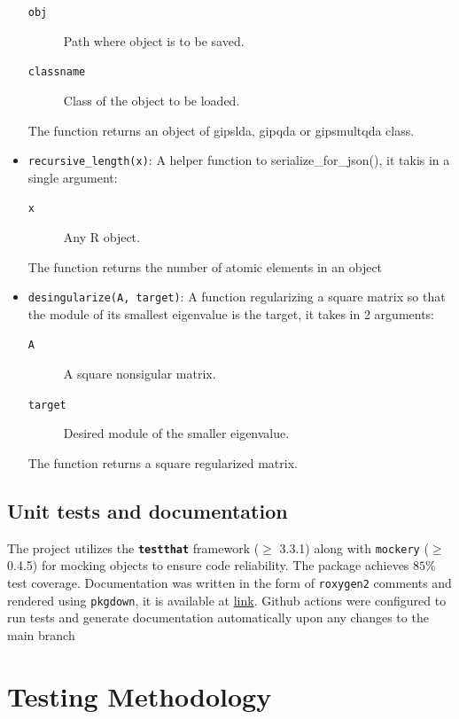 \documentclass[a4paper,11pt,twoside]{report}
\theoremstyle{definition}
\begin{document}
\begin{itemize}
\begin{description}
        \item[\texttt{obj}] Path where object is to be saved.
        \item[\texttt{classname}] Class of the object to be loaded.
    \end{description}
    The function returns an object of gipslda, gipqda or gipsmultqda class.
    \item \texttt{recursive\_length(x)}: A helper function to serialize\_for\_json(), it takis in a single argument:
    \begin{description}
        \item[\texttt{x}] Any R object.
    \end{description}
    The function returns the number of atomic elements in an object
    \item \texttt{desingularize(A, target)}: A function regularizing a square matrix so that the module of its smallest eigenvalue is the target, it takes in 2 arguments:
    \begin{description}
        \item[\texttt{A}] A square nonsigular matrix.
        \item[\texttt{target}] Desired module of the smaller eigenvalue.
    \end{description}
    The function returns a square regularized matrix.
\end{itemize}
\section{Unit tests and documentation}
The project utilizes the \textbf{\texttt{testthat}} framework ($\ge$ 3.3.1) along with \texttt{mockery} ($\ge$ 0.4.5) for mocking objects to ensure code reliability. The package achieves $85\%$ test coverage.
Documentation was written in the form of \texttt{roxygen2} comments and rendered using \texttt{pkgdown}, it is available at \href{https://antonikingston.github.io/gipsDA/}{link}. Github actions were configured to run tests and generate documentation automatically upon any changes to the main branch



\chapter{Testing Methodology}
\label{ch:testing_methodology}
\end{document}
